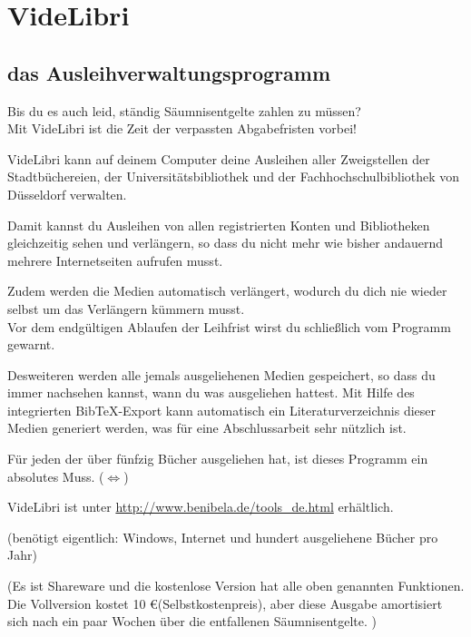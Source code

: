 \documentclass[14pt,a4paper,parskip]{scrbook}
\begin{document}
\chapter*{\centering \textbf{VideLibri}}
\section*{\centering das Ausleihverwaltungsprogramm}

	\thispagestyle{empty}
Bis du es auch leid, ständig Säumnisentgelte zahlen zu müssen?\\
Mit VideLibri ist die Zeit der verpassten Abgabefristen vorbei!

VideLibri kann auf deinem Computer deine Ausleihen aller Zweigstellen der Stadtbüchereien, der Universitätsbibliothek und der Fachhochschulbibliothek von Düsseldorf verwalten.

Damit kannst du Ausleihen von allen registrierten Konten und Bibliotheken gleichzeitig sehen und verlängern, so dass du nicht mehr wie bisher andauernd mehrere Internetseiten aufrufen musst.

Zudem werden die Medien automatisch verlängert, wodurch du dich nie wieder selbst um das Verlängern kümmern musst.\\
 Vor dem endgültigen Ablaufen der Leihfrist wirst du schließlich vom Programm gewarnt.

Desweiteren werden alle jemals ausgeliehenen Medien gespeichert, so dass du immer nachsehen kannst, wann du was ausgeliehen hattest. Mit Hilfe des integrierten BibTeX-Export kann automatisch ein Literaturverzeichnis dieser Medien generiert werden, was für eine Abschlussarbeit sehr nützlich ist.

Für jeden der über fünfzig Bücher ausgeliehen hat, ist dieses Programm ein absolutes Muss. ($\Leftrightarrow$)

VideLibri ist unter \url{http://www.benibela.de/tools_de.html} erhältlich.

\begin{small}
(benötigt eigentlich: Windows, Internet und hundert ausgeliehene Bücher pro Jahr)

(Es ist Shareware und die kostenlose Version hat alle oben genannten Funktionen. Die Vollversion kostet 10 \euro (Selbstkostenpreis), aber diese Ausgabe amortisiert sich nach ein paar Wochen über die entfallenen  Säumnisentgelte. ) 
\end{small}
%
%
\end{document}
